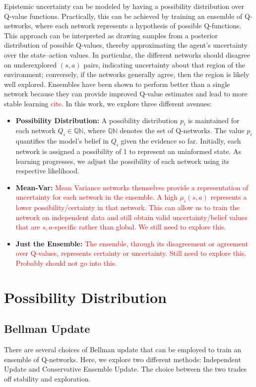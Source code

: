 \documentclass[12pt,a4paper]{report}
\newcommand\myworries[1]{\textcolor{red}{#1}}
\begin{document}
Epistemic uncertainty can be modeled by having a possibility distribution over Q-value functions. Practically, this can be achieved by training an ensemble of Q-networks, where each network represents a hypothesis of possible Q-functions. This approach can be interpreted as drawing samples from a posterior distribution of possible Q-values, thereby approximating the agent's uncertainty over the state–action values. In particular, the different networks should disagree on underexplored \((s,a)\) pairs, indicating uncertainty about that region of the environment; conversely, if the networks generally agree, then the region is likely well explored. Ensembles have been shown to perform better than a single network because they can provide improved Q-value estimates and lead to more stable learning \myworries{cite}. In this work, we explore three different avenues:
\begin{itemize}
  \item \textbf{Possibility Distribution:}  
  A possibility distribution \(p_i\) is maintained for each network \(Q_i \in \mathbb{QN}\), where \(\mathbb{QN}\) denotes the set of Q-networks. The value \(p_i\) quantifies the model's belief in \(Q_i\) given the evidence so far. Initially, each network is assigned a possibility of 1 to represent an uninformed state. As learning progresses, we adjust the possibility of each network using its respective likelihood.
  
  \item \textbf{Mean-Var:}  
  \myworries{Mean Variance networks themselves provide a representation of uncertainty for each network in the ensemble. A high \(\mu_i(s,a)\) represents a lower possibility/certainty in that network. This can allow us to train the network on independent data and still obtain valid uncertainty/belief values that are \(s,a\)-specific rather than global. We still need to explore this.} 
  
  \item \textbf{Just the Ensemble:}  
  \myworries{The ensemble, through its disagreement or agreement over Q-values, represents certainty or uncertainty. Still need to explore this. Probably should not go into this. }
\end{itemize}

\section{Possibility Distribution}
\subsection{Bellman Update}
There are several choices of Bellman update that can be employed to train an ensemble of Q-networks. Here, we explore two different methods: Independent Update and Conservative Ensemble Update. The choice between the two trades off stability and exploration.
\end{document}
